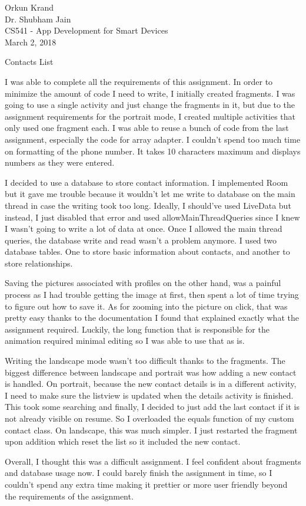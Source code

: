 \documentclass{article}
\begin{document}
\raggedright

Orkun Krand \\ Dr. Shubham Jain \\ CS541 - App Development for Smart Devices \\ March 2, 2018
    
    
	\centerline{Contacts List} 

I was able to complete all the requirements of this assignment. In order to minimize the amount of code I need to write, I initially created fragments. I was going to use a single activity and just change the fragments in it, but due to the assignment requirements for the portrait mode, I created multiple activities that only used one fragment each. I was able to reuse a bunch of code from the last assignment, especially the code for array adapter. I couldn't spend too much time on formatting of the phone number. It takes 10 characters maximum and displays numbers as they were entered.
\hfill \linebreak

I decided to use a database to store contact information. I implemented Room but it gave me trouble because it wouldn't let me write to database on the main thread in case the writing took too long. Ideally, I should've used LiveData but instead, I just disabled that error and used allowMainThreadQueries since I knew I wasn't going to write a lot of data at once. Once I allowed the main thread queries, the database write and read wasn't a problem anymore. I used two database tables. One to store basic information about contacts, and another to store relationships.
\hfill \linebreak

Saving the pictures associated with profiles on the other hand, was a painful process as I had trouble getting the image at first, then spent a lot of time trying to figure out how to save it. As for zooming into the picture on click, that was pretty easy thanks to the documentation I found that explained exactly what the assignment required. Luckily, the long function that is responsible for the animation required minimal editing so I was able to use that as is. 
\hfill \linebreak

Writing the landscape mode wasn't too difficult thanks to the fragments. The biggest difference between landscape and portrait was how adding a new contact is handled. On portrait, because the new contact details is in a different activity, I need to make sure the listview is updated when the details activity is finished. This took some searching and finally, I decided to just add the last contact if it is not already visible on resume. So I overloaded the equals function of my custom contact class. On landscape, this was much simpler. I just restarted the fragment upon addition which reset the list so it included the new contact.
\hfill \linebreak

Overall, I thought this was a difficult assignment. I feel confident about fragments and database usage now. I could barely finish the assignment in time, so I couldn't spend any extra time making it prettier or more user friendly beyond the requirements of the assignment. 
\end{document}
